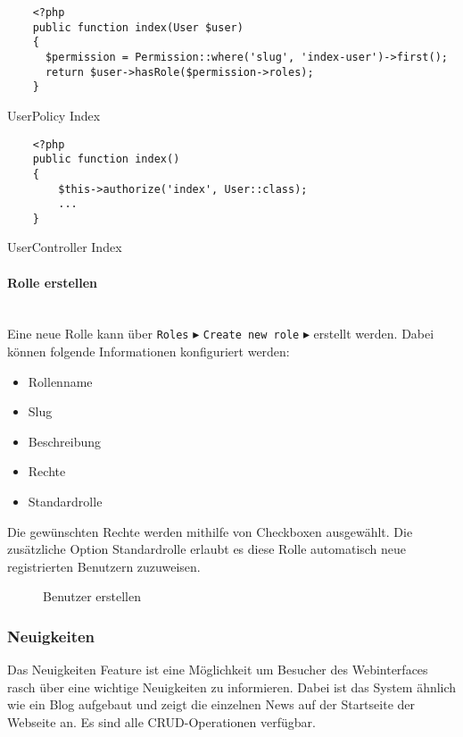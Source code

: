 \begin{listing}[H]
  \begin{verbatim}
    <?php
    public function index(User $user)
    {
      $permission = Permission::where('slug', 'index-user')->first();
      return $user->hasRole($permission->roles);
    }
  \end{verbatim}
  \caption{UserPolicy Index}
  \label{lst:roleseeder}
\end{listing}

\begin{listing}[H]
  \begin{verbatim}
    <?php
    public function index()
    {
        $this->authorize('index', User::class);
        ...
    }
  \end{verbatim}
  \caption{UserController Index}
  \label{lst:roleseeder}
\end{listing}

\paragraph{Rolle erstellen}\mbox{}\\
Eine neue Rolle kann über \verb|Roles| $\blacktriangleright$ 
\verb|Create new role| $\blacktriangleright$ erstellt werden. Dabei können
folgende Informationen konfiguriert werden:

\begin{itemize}
  \item Rollenname
  \item Slug
  \item Beschreibung
  \item Rechte
  \item Standardrolle
\end{itemize}

Die gewünschten Rechte werden mithilfe von Checkboxen ausgewählt. Die
zusätzliche Option Standardrolle erlaubt es diese Rolle automatisch neue
registrierten Benutzern zuzuweisen.

\begin{figure}[H]
  \centering
  \caption{Benutzer erstellen}
\end{figure}


\subsubsection{Neuigkeiten}
Das Neuigkeiten Feature ist eine Möglichkeit um Besucher des Webinterfaces
rasch über eine wichtige Neuigkeiten zu informieren. Dabei ist das System ähnlich
wie ein Blog aufgebaut und zeigt die einzelnen News auf der Startseite der
Webseite an. Es sind alle CRUD-Operationen verfügbar.

